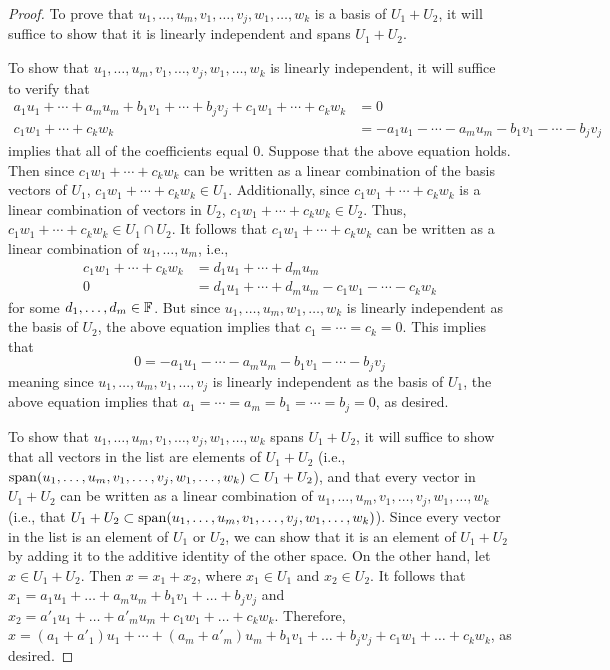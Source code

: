 \documentclass[../main.tex]{subfiles}
\begin{document}
\begin{itemize}
\begin{theorem}
\begin{proof}
            To prove that $u_1,\dots,u_m,v_1,\dots,v_j,w_1,\dots,w_k$ is a basis of $U_1+U_2$, it will suffice to show that it is linearly independent and spans $U_1+U_2$.\par
            To show that $u_1,\dots,u_m,v_1,\dots,v_j,w_1,\dots,w_k$ is linearly independent, it will suffice to verify that
            \begin{align*}
                a_1u_1+\cdots+a_mu_m+b_1v_1+\cdots+b_jv_j+c_1w_1+\cdots+c_kw_k &= 0\\
                c_1w_1+\cdots+c_kw_k &= -a_1u_1-\cdots-a_mu_m-b_1v_1-\cdots-b_jv_j
            \end{align*}
            implies that all of the coefficients equal 0. Suppose that the above equation holds. Then since $c_1w_1+\cdots+c_kw_k$ can be written as a linear combination of the basis vectors of $U_1$, $c_1w_1+\cdots+c_kw_k\in U_1$. Additionally, since $c_1w_1+\cdots+c_kw_k$ is a linear combination of vectors in $U_2$, $c_1w_1+\cdots+c_kw_k\in U_2$. Thus, $c_1w_1+\cdots+c_kw_k\in U_1\cap U_2$. It follows that $c_1w_1+\cdots+c_kw_k$ can be written as a linear combination of $u_1,\dots,u_m$, i.e.,
            \begin{align*}
                c_1w_1+\cdots+c_kw_k &= d_1u_1+\cdots+d_mu_m\\
                0 &= d_1u_1+\cdots+d_mu_m-c_1w_1-\cdots-c_kw_k
            \end{align*}
            for some $d_1,\dots,d_m\in\mathbb{F}$. But since $u_1,\dots,u_m,w_1,\dots,w_k$ is linearly independent as the basis of $U_2$, the above equation implies that $c_1=\cdots=c_k=0$. This implies that
            \begin{equation*}
                0 = -a_1u_1-\cdots-a_mu_m-b_1v_1-\cdots-b_jv_j
            \end{equation*}
            meaning since $u_1,\dots,u_m,v_1,\dots,v_j$ is linearly independent as the basis of $U_1$, the above equation implies that $a_1=\cdots=a_m=b_1=\cdots=b_j=0$, as desired.\par
            To show that $u_1,\dots,u_m,v_1,\dots,v_j,w_1,\dots,w_k$ spans $U_1+U_2$, it will suffice to show that all vectors in the list are elements of $U_1+U_2$ (i.e., $\operatorname{span}(u_1,\dots,u_m,v_1,\dots,v_j,w_1,\dots,w_k)\subset U_1+U_2$), and that every vector in $U_1+U_2$ can be written as a linear combination of $u_1,\dots,u_m,v_1,\dots,v_j,w_1,\dots,w_k$ (i.e., that $U_1+U_2\subset\operatorname{span}(u_1,\dots,u_m,v_1,\dots,v_j,w_1,\dots,w_k)$). Since every vector in the list is an element of $U_1$ or $U_2$, we can show that it is an element of $U_1+U_2$ by adding it to the additive identity of the other space. On the other hand, let $x\in U_1+U_2$. Then $x=x_1+x_2$, where $x_1\in U_1$ and $x_2\in U_2$. It follows that $x_1=a_1u_1+\dots+a_mu_m+b_1v_1+\dots+b_jv_j$ and $x_2=a'_1u_1+\dots+a'_mu_m+c_1w_1+\dots+c_kw_k$. Therefore, $x=(a_1+a'_1)u_1+\cdots+(a_m+a'_m)u_m+b_1v_1+\dots+b_jv_j+c_1w_1+\dots+c_kw_k$, as desired.\par\smallskip

\end{proof}
\end{theorem}
\end{itemize}
\end{document}
